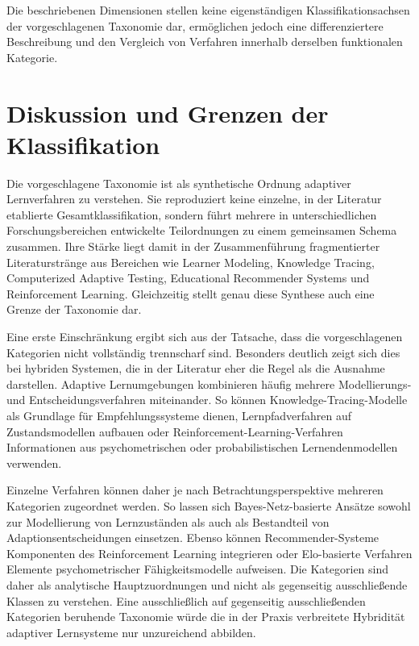 Die beschriebenen Dimensionen stellen keine eigenständigen
Klassifikationsachsen der vorgeschlagenen Taxonomie dar, ermöglichen
jedoch eine differenziertere Beschreibung und den Vergleich von
Verfahren innerhalb derselben funktionalen Kategorie.

\section{Diskussion und Grenzen der
Klassifikation}\label{diskussion-und-grenzen-der-klassifikation}

Die vorgeschlagene Taxonomie ist als synthetische Ordnung adaptiver
Lernverfahren zu verstehen. Sie reproduziert keine einzelne, in der
Literatur etablierte Gesamtklassifikation, sondern führt mehrere in
unterschiedlichen Forschungsbereichen entwickelte Teilordnungen zu einem
gemeinsamen Schema zusammen. Ihre Stärke liegt damit in der
Zusammenführung fragmentierter Literaturstränge aus Bereichen wie
Learner Modeling, Knowledge Tracing, Computerized Adaptive Testing,
Educational Recommender Systems und Reinforcement Learning. Gleichzeitig
stellt genau diese Synthese auch eine Grenze der Taxonomie dar.

Eine erste Einschränkung ergibt sich aus der Tatsache, dass die
vorgeschlagenen Kategorien nicht vollständig trennscharf sind. Besonders
deutlich zeigt sich dies bei hybriden Systemen, die in der Literatur
eher die Regel als die Ausnahme darstellen. Adaptive Lernumgebungen
kombinieren häufig mehrere Modellierungs- und Entscheidungsverfahren
miteinander. So können Knowledge-Tracing-Modelle als Grundlage für
Empfehlungssysteme dienen, Lernpfadverfahren auf Zustandsmodellen
aufbauen oder Reinforcement-Learning-Verfahren Informationen aus
psychometrischen oder probabilistischen Lernendenmodellen verwenden.

Einzelne Verfahren können daher je nach Betrachtungsperspektive mehreren
Kategorien zugeordnet werden. So lassen sich Bayes-Netz-basierte Ansätze
sowohl zur Modellierung von Lernzuständen als auch als Bestandteil von
Adaptionsentscheidungen einsetzen. Ebenso können Recommender-Systeme
Komponenten des Reinforcement Learning integrieren oder Elo-basierte
Verfahren Elemente psychometrischer Fähigkeitsmodelle aufweisen. Die
Kategorien sind daher als analytische Hauptzuordnungen und nicht als
gegenseitig ausschließende Klassen zu verstehen. Eine ausschließlich auf
gegenseitig ausschließenden Kategorien beruhende Taxonomie würde die in
der Praxis verbreitete Hybridität adaptiver Lernsysteme nur unzureichend
abbilden.

